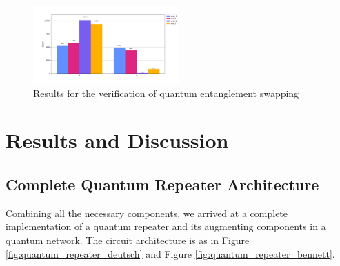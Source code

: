 \documentclass[11pt]{article}
\begin{document}
\begin{figure}[ht]
    \centering
    \includegraphics[width=0.5\textwidth]{figures/entanglement_swapping_verification.jpg}
    \caption[Entanglement swapping verification results]{Results for the verification of quantum entanglement swapping}
    \label{fig:entanglement_swapping_verification}
\end{figure}
\section{Results and Discussion}
\subsection{Complete Quantum Repeater Architecture}
Combining all the necessary components, we arrived at a complete implementation of a quantum repeater and its augmenting components in a quantum network. The circuit architecture is as in Figure \ref{fig:quantum_repeater_deutsch} and Figure \ref{fig:quantum_repeater_bennett}.
\end{document}
